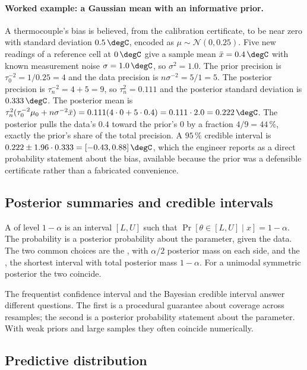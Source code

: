 \paragraph{Worked example: a Gaussian mean with an informative
prior.} A thermocouple's bias is believed, from the calibration
certificate, to be near zero with standard deviation
$0.5\,\degC$, encoded as $\mu \sim \mathcal{N}(0, 0.25)$. Five new
readings of a reference cell at $0\,\degC$ give a sample mean
$\bar{x} = 0.4\,\degC$ with known measurement noise $\sigma = 1.0\,
\degC$, so $\sigma^{2} = 1.0$. The prior precision is
$\tau_{0}^{-2} = 1/0.25 = 4$ and the data precision is
$n\sigma^{-2} = 5/1 = 5$. The posterior precision is
$\tau_{n}^{-2} = 4 + 5 = 9$, so $\tau_{n}^{2} = 0.111$ and the
posterior standard deviation is $0.333\,\degC$. The posterior mean
is $\tau_{n}^{2}(\tau_{0}^{-2}\mu_{0} + n\sigma^{-2}\bar{x}) =
0.111(4 \cdot 0 + 5 \cdot 0.4) = 0.111 \cdot 2.0 = 0.222\,\degC$.
The posterior pulls the data's $0.4$ toward the prior's $0$ by a
fraction $4/9 = 44\,\%$, exactly the prior's share of the total
precision. A $95\,\%$ credible interval is $0.222 \pm 1.96 \cdot
0.333 = [-0.43, 0.88]\,\degC$, which the engineer reports as a
direct probability statement about the bias, available because the
prior was a defensible certificate rather than a fabricated
convenience.

\subsection{Posterior summaries and credible intervals}

A  of level $1-\alpha$ is an interval
$[L, U]$ such that $\Pr[\theta \in [L, U] \mid x] = 1 - \alpha$.
The probability is a posterior probability about the parameter,
given the data. The two common choices are the
, with $\alpha/2$ posterior
mass on each side, and the , the shortest interval with total posterior mass
$1 - \alpha$. For a unimodal symmetric posterior the two coincide.

The frequentist confidence interval and the Bayesian credible
interval answer different questions. The first is a procedural
guarantee about coverage across resamples; the second is a posterior
probability statement about the parameter. With weak priors and
large samples they often coincide numerically.

\subsection{Predictive distribution}

